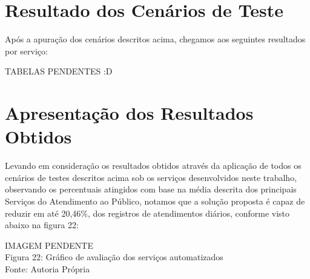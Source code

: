\section{Resultado dos Cenários de Teste}

Após a apuração dos cenários descritos acima, chegamos aos seguintes resultados por serviço:

\begin{center}
	TABELAS PENDENTES :D		
\end{center}


\section{Apresentação dos Resultados Obtidos}

Levando em consideração os resultados obtidos através da aplicação de todos os cenários de testes descritos acima sob os serviços desenvolvidos neste trabalho, observando os percentuais atingidos com base na média descrita dos principais Serviços do Atendimento ao Público, notamos que a solução proposta é capaz de reduzir em até 20,46\%, dos registros de atendimentos diários, conforme visto abaixo na figura 22:	


\begin{center}
	IMAGEM PENDENTE \\
	Figura 22: Gráfico de avaliação dos serviços automatizados \\
	Fonte: Autoria Própria \\			
\end{center}
